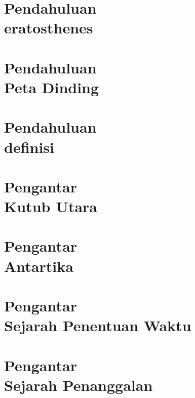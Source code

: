 \documentclass{WileySix}
\begin{document}
\chapter[Sejarah eratosthenes]
{Pendahuluan\\ eratosthenes}



%

\chapter[Sejarah Peta Dinding]
{Pendahuluan\\ Peta Dinding}



\chapter[Pendahuluan]
{Pendahuluan\\ definisi}


\chapter[Sejarah Kutub Utara]
{Pengantar\\ Kutub Utara}


\chapter[Tentang Kutub Selatan]
{Pengantar\\ Antartika}


\chapter[Sejarah Penentuan Waktu]
{Pengantar\\ Sejarah Penentuan Waktu}


\chapter[Sejarah Penanggalan]
{Pengantar\\ Sejarah  Penanggalan}

\end{document}
